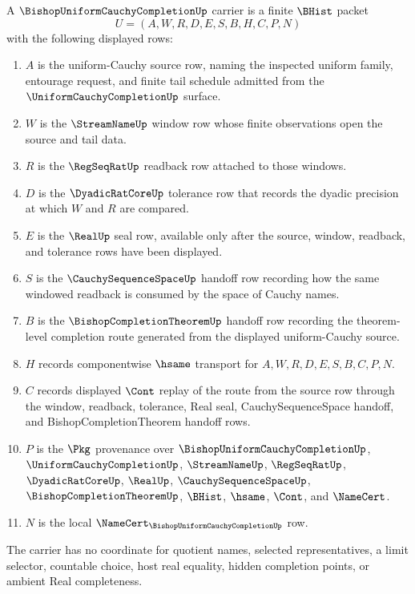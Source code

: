 \begin{definition}
\label{def:bishop-uniform-cauchy-completion-carrier}
A $\BishopUniformCauchyCompletionUp$ carrier is a finite $\BHist$ packet
$$
U=(A,W,R,D,E,S,B,H,C,P,N)
$$
with the following displayed rows:
\begin{enumerate}
\item $A$ is the uniform-Cauchy source row, naming the inspected uniform family, entourage request, and finite tail schedule admitted from the $\UniformCauchyCompletionUp$ surface.
\item $W$ is the $\StreamNameUp$ window row whose finite observations open the source and tail data.
\item $R$ is the $\RegSeqRatUp$ readback row attached to those windows.
\item $D$ is the $\DyadicRatCoreUp$ tolerance row that records the dyadic precision at which $W$ and $R$ are compared.
\item $E$ is the $\RealUp$ seal row, available only after the source, window, readback, and tolerance rows have been displayed.
\item $S$ is the $\CauchySequenceSpaceUp$ handoff row recording how the same windowed readback is consumed by the space of Cauchy names.
\item $B$ is the $\BishopCompletionTheoremUp$ handoff row recording the theorem-level completion route generated from the displayed uniform-Cauchy source.
\item $H$ records componentwise $\hsame$ transport for $A,W,R,D,E,S,B,C,P,N$.
\item $C$ records displayed $\Cont$ replay of the route from the source row through the window, readback, tolerance, Real seal, CauchySequenceSpace handoff, and BishopCompletionTheorem handoff rows.
\item $P$ is the $\Pkg$ provenance over $\BishopUniformCauchyCompletionUp$, $\UniformCauchyCompletionUp$, $\StreamNameUp$, $\RegSeqRatUp$, $\DyadicRatCoreUp$, $\RealUp$, $\CauchySequenceSpaceUp$, $\BishopCompletionTheoremUp$, $\BHist$, $\hsame$, $\Cont$, and $\NameCert$.
\item $N$ is the local $\NameCert_{\BishopUniformCauchyCompletionUp}$ row.
\end{enumerate}
The carrier has no coordinate for quotient names, selected representatives, a limit selector, countable choice, host real equality, hidden completion points, or ambient Real completeness.
\end{definition}

